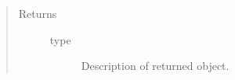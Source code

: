 \documentclass[letterpaper,10pt,english]{sphinxmanual}
\begin{document}
\begin{fulllineitems}
\begin{fulllineitems}
\begin{quote}
\begin{description}
\item[{Returns}] \leavevmode\begin{description}
\item[{type}] \leavevmode
Description of returned object.

\end{description}

\end{description}\end{quote}

\end{fulllineitems}


\end{fulllineitems}

\end{document}

